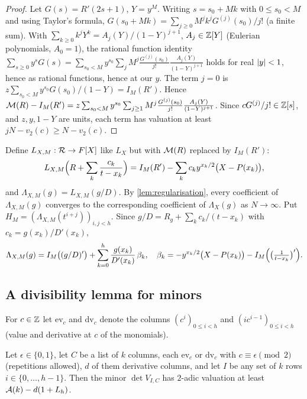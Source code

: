 \begin{proof}
Let $G(s)=R'(2s+1)$, $Y=y^M$. Writing $s=s_0+Mk$ with $0\le s_0<M$ and using Taylor's formula,
$G(s_0+Mk)=\sum_{j\ge0}M^jk^jG^{(j)}(s_0)/j!$ (a finite sum). With
$\sum_{k\ge0}k^jY^k=A_j(Y)/(1-Y)^{j+1}$, $A_j\in\mathbb{Z}[Y]$ (Eulerian polynomials, $A_0=1$), the rational
function identity $\sum_{s\ge0}y^sG(s)=\sum_{s_0<M}y^{s_0}\sum_jM^j\frac{G^{(j)}(s_0)}{j!}\frac{A_j(Y)}{(1-Y)^{j+1}}$
holds for real $\left\lvert y\right\rvert<1$, hence as rational functions, hence at our $y$. The term $j=0$ is $z\sum_{s_0<M}y^{s_0}G(s_0)/(1-Y)=I_M(R')$. Hence
$\mathcal{M}(R)-I_M(R')=z\sum_{s_0<M}y^{s_0}\sum_{j\ge1}M^j\frac{G^{(j)}(s_0)}{j!}\frac{A_j(Y)}{(1-Y)^{j+1}}$.
Since $cG^{(j)}/j!\in\mathbb{Z}[s]$, and $z,y,1-Y$ are units, each term has valuation at least
$jN-v_2(c)\ge N-v_2(c)$.
\end{proof}

Define $L_{X,M}:\mathcal{R}\to F[X]$ like $L_X$ but with $\mathcal{M}(R)$ replaced by $I_M(R')$:
\[
L_{X,M}\Bigl(R+\sum_k\frac{c_k}{t-x_k}\Bigr)=I_M(R')-\sum_kc_ky^{x_k/2}\bigl(X-P(x_k)\bigr),
\]
and $\Lambda_{X,M}(g)=L_{X,M}(g/D)$. By \cref{lem:regularisation}, every coefficient of
$\Lambda_{X,M}(g)$ converges to the corresponding coefficient of $\Lambda_X(g)$ as $N\to\infty$. Put
$H_M=(\Lambda_{X,M}(t^{i+j}))_{i,j<h}$. Since $g/D=R_g+\sum_kc_k/(t-x_k)$ with $c_k=g(x_k)/D'(x_k)$,
\begin{equation}\label{eq:LXM}
\Lambda_{X,M}(g)=I_M\bigl((g/D)'\bigr)+\sum_{k=0}^h\frac{g(x_k)}{D'(x_k)}\,\beta_k,\quad
\beta_k=-y^{x_k/2}\bigl(X-P(x_k)\bigr)-I_M\Bigl(\bigl(\tfrac1{t-x_k}\bigr)'\Bigr).
\end{equation}

\subsection{A divisibility lemma for minors}\label{subsec:parity}

For $c\in\mathbb{Z}$ let $\mathrm{ev}_c$ and $\mathrm{dv}_c$ denote the columns $(c^i)_{0\le i<h}$ and
$(ic^{i-1})_{0\le i<h}$ (value and derivative at $c$ of the monomials).

\begin{lemma}\label{lem:parity-minors}
Let $\epsilon\in\{0,1\}$, let $C$ be a list of $k$ columns, each $\mathrm{ev}_c$ or $\mathrm{dv}_c$ with
$c\equiv\epsilon\pmod2$ (repetitions allowed), $d$ of them derivative columns, and let $I$ be any set of
$k$ rows $i\in\{0,\dots,h-1\}$. Then the minor $\det V_{I,C}$ has $2$-adic valuation at least
$\mathcal{A}(k)-d(1+L_h)$.
\end{lemma}

